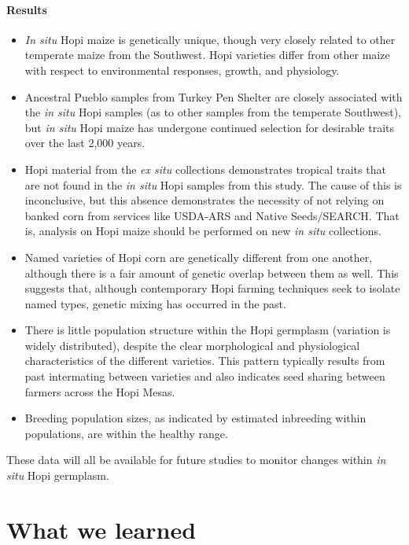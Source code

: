\documentclass[12pt,]{article}
\providecommand{\tightlist}{%
  \setlength{\itemsep}{0pt}\setlength{\parskip}{0pt}}
\let\oldparagraph\paragraph
\renewcommand{\paragraph}[1]{\oldparagraph{#1}\mbox{}}
\begin{document}
\hypertarget{results-1}{%
\paragraph{Results}\label{results-1}}

\begin{itemize}
\tightlist
\item
  \emph{In situ} Hopi maize is genetically unique, though very closely related to other temperate maize from the Southwest. Hopi varieties differ from other maize with respect to environmental responses, growth, and physiology.
\item
  Ancestral Pueblo samples from Turkey Pen Shelter are closely associated with the \emph{in situ} Hopi samples (as to other samples from the temperate Southwest), but \emph{in situ} Hopi maize has undergone continued selection for desirable traits over the last 2,000 years.
\item
  Hopi material from the \emph{ex situ} collections demonstrates tropical traits that are not found in the \emph{in situ} Hopi samples from this study. The cause of this is inconclusive, but this absence demonstrates the necessity of not relying on banked corn from services like USDA-ARS and Native Seeds/SEARCH. That is, analysis on Hopi maize should be performed on new \emph{in situ} collections.
\item
  Named varieties of Hopi corn are genetically different from one another, although there is a fair amount of genetic overlap between them as well. This suggests that, although contemporary Hopi farming techniques seek to isolate named types, genetic mixing has occurred in the past.
\item
  There is little population structure within the Hopi germplasm (variation is widely distributed), despite the clear morphological and physiological characteristics of the different varieties. This pattern typically results from past intermating between varieties and also indicates seed sharing between farmers across the Hopi Mesas.
\item
  Breeding population sizes, as indicated by estimated inbreeding within populations, are within the healthy range.
\end{itemize}

These data will all be available for future studies to monitor changes within \emph{in situ} Hopi germplasm.

\hypertarget{what-we-learned}{%
\section{What we learned}\label{what-we-learned}}
\end{document}
